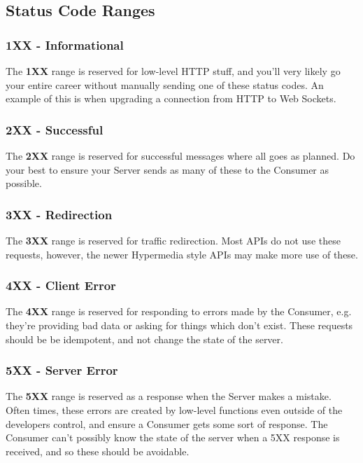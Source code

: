 \documentclass{book}
\begin{document}
\subsection{Status Code Ranges}

\subsubsection{1XX - Informational}

The \textbf{1XX} range is reserved for low-level HTTP stuff, and you'll very likely go your entire career without manually sending one of these status codes. An example of this is when upgrading a connection from HTTP to Web Sockets.

\subsubsection{2XX - Successful}

The \textbf{2XX} range is reserved for successful messages where all goes as planned. Do your best to ensure your Server sends as many of these to the Consumer as possible.

\subsubsection{3XX - Redirection}

The \textbf{3XX} range is reserved for traffic redirection. Most APIs do not use these requests, however, the newer Hypermedia style APIs may make more use of these.

\subsubsection{4XX - Client Error}

The \textbf{4XX} range is reserved for responding to errors made by the Consumer, e.g. they're providing bad data or asking for things which don't exist. These requests should be be idempotent, and not change the state of the server.

\subsubsection{5XX - Server Error}

The \textbf{5XX} range is reserved as a response when the Server makes a mistake. Often times, these errors are created by low-level functions even outside of the developers control, and ensure a Consumer gets some sort of response. The Consumer can't possibly know the state of the server when a 5XX response is received, and so these should be avoidable.
\end{document}

